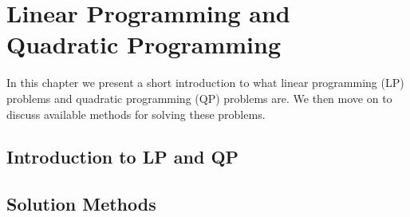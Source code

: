 \chapter{Linear Programming and Quadratic Programming}
\label{ch:background}

In this chapter we present a short introduction to what linear programming (LP)
problems and quadratic programming (QP) problems are.
We then move on to discuss available methods for solving these problems.

\section{Introduction to LP and QP}
\label{sec:backlp}


\section{Solution Methods}
\label{sec:backsol}


